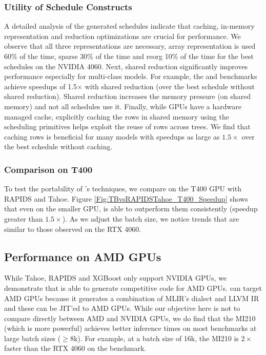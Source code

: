\subsubsection*{Utility of Schedule Constructs}
A detailed analysis of the generated schedules indicate that caching, in-memory representation 
and reduction optimizations are crucial for performance. We observe that all three representations 
are necessary, array representation is used 60\% of the time, sparse 30\% of the time and reorg 
10\% of the time for the best schedules on the NVIDIA 4060.  
Next, shared reduction significantly improves performance especially for multi-class models. For example, 
the  and  benchmarks achieve speedups of 1.5$\times$ with shared reduction (over the best schedule without shared reduction). 
Shared reduction increases the memory pressure (on shared memory) and not all schedules use it.
Finally, while GPUs have a hardware managed cache, explicitly caching the rows in shared memory using the scheduling primitives 
helps exploit the reuse of rows across trees. We find that caching rows is beneficial for many models
with speedups as large as $1.5\times$ over the best schedule without caching.

\subsubsection*{Comparison on T400}
To test the portability of \Treebeard{}'s techniques, we compare \Treebeard{} on the T400 GPU with RAPIDS and Tahoe. 
Figure \ref{Fig:TBvsRAPIDSTahoe_T400_Speedup} shows 
that even on the smaller GPU, \Treebeard{} is able to outperform them consistently (speedup greater than $1.5\times$). 
As we adjust the batch size, we notice trends that are similar to those observed on the RTX 4060.

\subsection{Performance on AMD GPUs}
While Tahoe, RAPIDS and XGBoost only support NVIDIA GPUs, we demonstrate that \Treebeard{} 
is able to generate competitive code for AMD GPUs. \Treebeard{} can target AMD GPUs 
because it generates a combination of MLIR's  dialect and LLVM IR 
and these can be JIT'ed to AMD GPUs. While our objective here is not to compare directly 
between AMD and NVIDIA GPUs, we do find that the MI210 (which is more powerful) achieves better inference times 
on most benchmarks at large batch sizes ($\geq8$k). For example, at a batch size of 16k,
the MI210 is $2\times$ faster than the RTX 4060 on the  benchmark. 

